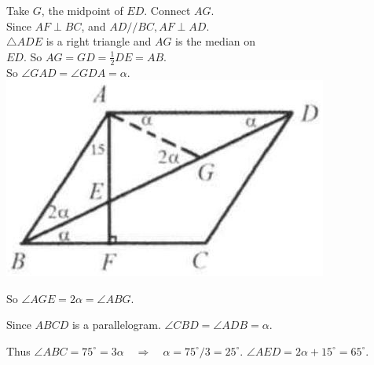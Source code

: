 \documentclass[10pt]{article}
\begin{document}
Take \(G\), the midpoint of \(E D\). Connect \(A G\).\\
Since \(A F \perp B C\), and \(A D / / B C, A F \perp A D\).\\
\(\triangle A D E\) is a right triangle and \(A G\) is the median on\\
\(E D\). So \(A G=G D=\frac{1}{2} D E=A B\).\\
So \(\angle G A D=\angle G D A=\alpha\).\\
\includegraphics[max width=\textwidth, center]{2025_04_17_97bc1f7e44d93c271a88g-022(1)}

So \(\angle A G E=2 \alpha=\angle A B G\).

Since \(A B C D\) is a parallelogram. \(\angle C B D=\angle A D B=\alpha\).

Thus \(\angle A B C=75^{\circ}=3 \alpha \quad \Rightarrow \quad \alpha=75^{\circ} / 3=25^{\circ}\). \(\angle A E D=2 \alpha+15^{\circ}=65^{\circ}\).
\end{document}
